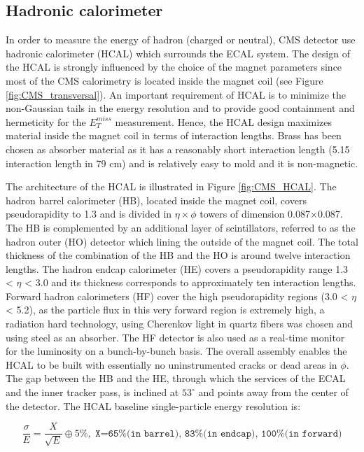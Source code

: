 \subsection{Hadronic calorimeter}\label{subsec:CMS_HCAL}
In order to measure the energy of hadron (charged or neutral), CMS detector use hadronic calorimeter (HCAL) which surrounds the ECAL system. The design of the HCAL is strongly influenced by the choice of the magnet parameters since most of the CMS calorimetry is located inside the magnet coil (see Figure \ref{fig:CMS_transversal}). An important requirement of HCAL is to minimize the non-Gaussian tails in the energy resolution and to provide good containment and hermeticity for the $E_{T}^{miss}$ measurement. Hence, the HCAL design maximizes material inside the magnet coil in terms of interaction lengths. Brass has been chosen as absorber material as it has a reasonably short interaction length (5.15 interaction length in 79 cm) and is relatively easy to mold and it is non-magnetic.

The architecture of the HCAL is illustrated in Figure \ref{fig:CMS_HCAL}. The hadron barrel calorimeter (HB), located inside the magnet coil, covers pseudorapidity to 1.3 and is divided in $\eta\times\phi$ towers of dimension 0.087$\times$0.087. The HB is complemented by an additional layer of scintillators, referred to as the hadron outer (HO) detector which lining the outside of the magnet coil. The total thickness of the combination of the HB and the HO is around twelve interaction lengths. The hadron endcap calorimeter (HE) covers a pseudorapidity range 1.3 < $\eta$ < 3.0 and its thickness corresponds to approximately ten interaction lengths. Forward hadron calorimeters (HF) cover the high pseudorapidity regions (3.0 < $\eta$ < 5.2), as the particle flux in this very forward region is extremely high, a radiation hard technology, using Cherenkov light in quartz fibers was chosen and using steel as an absorber. The HF detector is also used as a real-time monitor for the luminosity on a bunch-by-bunch basis.
The overall assembly enables the HCAL to be built with essentially no uninstrumented cracks or dead areas in $\phi$. The gap between the HB and the HE, through which the services of the ECAL and the inner tracker pass, is inclined at $53^{\circ}$ and points away from the center of the detector.
The HCAL baseline single-particle energy resolution is:

\begin{equation}
\frac{\sigma}{E}=\frac{X}{\sqrt{E}}\oplus5\%, \texttt{~X=65\% (in barrel), 83\% (in endcap), 100\% (in forward)}
\label{eq:HCAL_resolution}
\end{equation}




